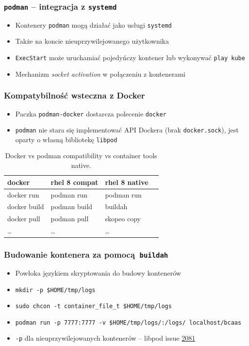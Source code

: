 \documentclass[dvipsnames,table]{beamer}
\begin{document}
\begin{frame}[fragile]
	\frametitle{{\tt podman} -- integracja z {\tt systemd}}
	\begin{itemize}
		\item Kontenery {\tt podman} mogą działać jako usługi {\tt systemd}
		\item Także na koncie nieuprzywilejowanego użytkownika
		\item {\tt ExecStart} może uruchamiać pojedyńczy kontener lub wykonywać {\tt play kube}
		\item Mechanizm {\em socket activation} w połączeniu z kontenerami
	\end{itemize}
%
\end{frame}

\begin{frame}
	\frametitle{Kompatybilność wsteczna z Docker}
	\begin{itemize}
		\item Paczka {\tt podman-docker} dostarcza polecenie {\tt docker}
		\item {\tt podman} nie stara się implementować API Dockera (brak {\tt docker.sock}), jest oparty o własną bibliotekę {\tt libpod}
	\end{itemize}
\centering
	\begin{table}
\caption{Docker vs podman compatibility vs container tools native.}
\label{porownanie}
\scriptsize
\begin{tabular}{llll}
\hline
docker & rhel 8 compat & rhel 8 native   \\ \hline
	docker run & podman run & podman run \\
	docker build & podman build & buildah  \\
	docker pull & podman pull & skopeo copy \\ 
	\ldots & \ldots & \ldots \\ \hline
\end{tabular}
\normalsize
\end{table}
\end{frame}

\begin{frame}[fragile]
	\frametitle{Budowanie kontenera za pomocą {\tt buildah}}
%
\begin{itemize}
	\item Powłoka językiem skryptowania do budowy kontenerów
	\item {\tt mkdir -p \$HOME/tmp/logs}
	\item {\tt sudo chcon -t container\_file\_t \$HOME/tmp/logs}
	\item {\tt podman run -p 7777:7777 -v \$HOME/tmp/logs/:/logs/ localhost/bcaas}
	\item {\tt -p} dla nieuprzywilejowanych kontenerów -- libpod issue \href{https://github.com/containers/libpod/issues/2081}{2081}
\end{itemize}
\end{frame}
\end{document}

